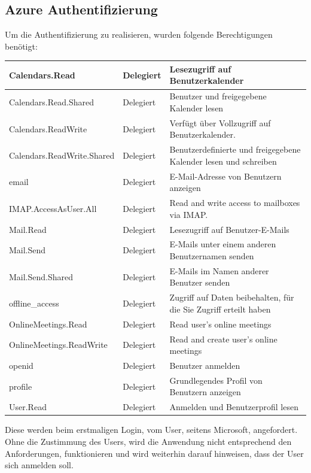 \subsection{Azure Authentifizierung}\label{subsec:Azure Authentifizierung}
Um die Authentifizierung zu realisieren, wurden folgende Berechtigungen benötigt:
\newline
\newline
    \centering
\small
    \begin{tabularx}{\textwidth}{|X|X|X|}
        \toprule
        \textbf{Calendars.Read} & \textbf{Delegiert} & \textbf{Lesezugriff auf Benutzerkalender}\\
        \midrule
        Calendars.Read.Shared & Delegiert & Benutzer und freigegebene Kalender lesen\\
        Calendars.ReadWrite & Delegiert & Verfügt über Vollzugriff auf Benutzerkalender.\\
        Calendars.ReadWrite.Shared & Delegiert & Benutzerdefinierte und freigegebene Kalender lesen und schreiben\\
        email & Delegiert & E-Mail-Adresse von Benutzern anzeigen \\
        IMAP.AccessAsUser.All & Delegiert & Read and write access to mailboxes via IMAP.\\
        Mail.Read & Delegiert & Lesezugriff auf Benutzer-E-Mails\\
        Mail.Send & Delegiert & E-Mails unter einem anderen Benutzernamen senden\\
        Mail.Send.Shared & Delegiert & E-Mails im Namen anderer Benutzer senden\\
        offline\_access & Delegiert & Zugriff auf Daten beibehalten, für die Sie Zugriff erteilt haben\\
        OnlineMeetings.Read & Delegiert & Read user's online meetings\\
        OnlineMeetings.ReadWrite & Delegiert & Read and create user's online meetings\\
        openid & Delegiert & Benutzer anmelden\\
        profile & Delegiert & Grundlegendes Profil von Benutzern anzeigen\\
        User.Read & Delegiert & Anmelden und Benutzerprofil lesen\\
        \bottomrule
    \end{tabularx}
    \caption{}
    \label{tab:}
\newline
\newline
\raggedright
\normalsize
Diese werden beim erstmaligen Login, vom User, seitens Microsoft, angefordert.
Ohne die Zustimmung des Users, wird die Anwendung nicht entsprechend den Anforderungen, funktionieren und wird weiterhin darauf hinweisen, dass der User sich anmelden soll.
